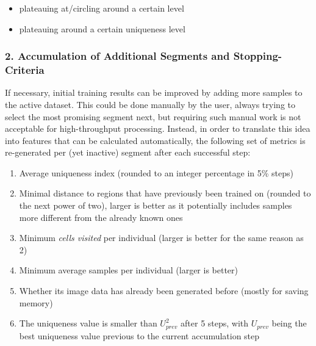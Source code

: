 \documentclass[9pt,lineno]{elife}
\begin{document}
\begin{itemize}[label=\textnormal{$\bullet$}]
    \item plateauing at/circling around a certain \protect{} level
    \item plateauing around a certain uniqueness level
\end{itemize}


\subsubsection{2. Accumulation of Additional Segments and Stopping-Criteria}

If necessary, initial training results can be improved by adding more samples to the active dataset. This could be done manually by the user, always trying to select the most promising segment next, but requiring such manual work is not acceptable for high-throughput processing. Instead, in order to translate this idea into features that can be calculated automatically, the following set of metrics is re-generated per (yet inactive) segment after each successful step:

\begin{enumerate} \label{sec:accumulation_quality_criteria}
    \item Average uniqueness index (rounded to an integer percentage in 5\% steps)
    \item Minimal distance to regions that have previously been trained on (rounded to the next power of two), larger is better as it potentially includes samples more different from the already known ones
    \item Minimum \textit{cells visited} per individual (larger is better for the same reason as 2)
    \item Minimum average samples per individual (larger is better)
    \item Whether its image data has already been generated before (mostly for saving memory)
    \item The uniqueness value is smaller than $U_{prev}^2$ after 5 steps, with $U_{prev}$ being the best uniqueness value previous to the current accumulation step
\end{enumerate}
\end{document}
